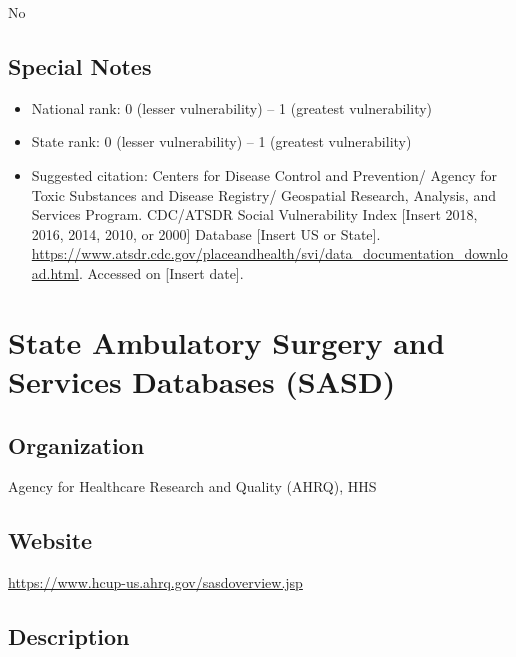 \documentclass[
]{book}
\providecommand{\tightlist}{%
  \setlength{\itemsep}{0pt}\setlength{\parskip}{0pt}}
\begin{document}
No

\hypertarget{special-notes-82}{%
\section{Special Notes}\label{special-notes-82}}

\begin{itemize}
\tightlist
\item
  National rank: 0 (lesser vulnerability) -- 1 (greatest vulnerability)
\item
  State rank: 0 (lesser vulnerability) -- 1 (greatest vulnerability)
\item
  Suggested citation: Centers for Disease Control and Prevention/ Agency for Toxic Substances and Disease Registry/ Geospatial Research, Analysis, and Services Program. CDC/ATSDR Social Vulnerability Index {[}Insert 2018, 2016, 2014, 2010, or 2000{]} Database {[}Insert US or State{]}. \url{https://www.atsdr.cdc.gov/placeandhealth/svi/data_documentation_download.html}. Accessed on {[}Insert date{]}.
\end{itemize}

\mainmatter

\hypertarget{state-ambulatory-surgery-and-services-databases-sasd}{%
\chapter{State Ambulatory Surgery and Services Databases (SASD)}\label{state-ambulatory-surgery-and-services-databases-sasd}}

\hypertarget{organization-83}{%
\section{Organization}\label{organization-83}}

Agency for Healthcare Research and Quality (AHRQ), HHS

\hypertarget{website-83}{%
\section{Website}\label{website-83}}

\url{https://www.hcup-us.ahrq.gov/sasdoverview.jsp}

\hypertarget{description-83}{%
\section{Description}\label{description-83}}
\end{document}
